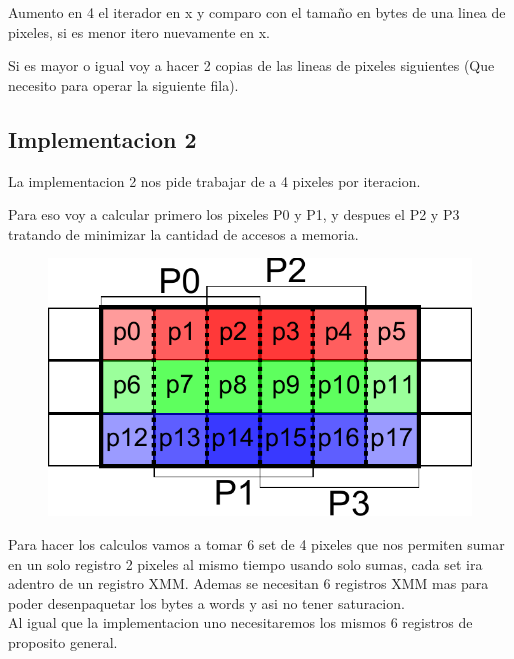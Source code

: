 Aumento en 4 el iterador en x y comparo con el tamaño en bytes de una linea de pixeles, si es menor itero nuevamente en x.

Si es mayor o igual voy a hacer 2 copias de las lineas de pixeles siguientes (Que necesito para operar la siguiente fila).

\subsection{Implementacion 2}
La implementacion 2 nos pide trabajar de a 4 pixeles por iteracion.

Para eso voy a calcular primero los pixeles P0 y P1, y despues el P2 y P3 tratando de minimizar la cantidad de accesos a memoria. \\

\begin{figure}[h!]
	\centering
	\includegraphics[scale=0.5]{images/BlurASM2_1}
\end{figure}

Para hacer los calculos vamos a tomar 6 set de 4 pixeles que nos permiten sumar en un solo registro 2 pixeles al mismo tiempo usando solo sumas, cada set ira adentro de un registro XMM. Ademas se necesitan 6 registros XMM mas para poder desenpaquetar los bytes a words y asi no tener saturacion. \\

Al igual que la implementacion uno necesitaremos los mismos 6 registros de proposito general. \\

